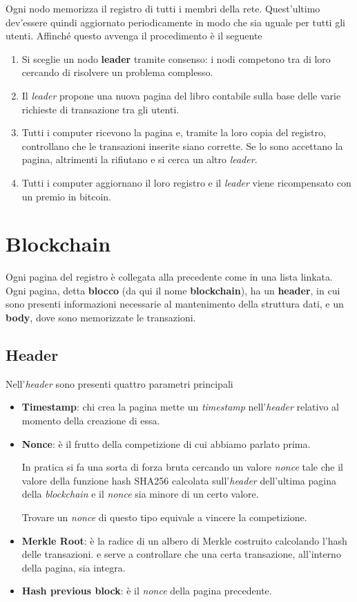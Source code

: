 Ogni nodo memorizza il registro di tutti i membri della rete. Quest'ultimo dev'essere quindi aggiornato periodicamente
in modo che sia uguale per tutti gli utenti. Affinch\'e questo avvenga il procedimento \`e il seguente
\begin{enumerate}
	\item Si sceglie un nodo \textbf{leader} tramite consenso: i nodi competono tra di loro cercando di risolvere un
	      problema complesso.
	\item Il \emph{leader} propone una nuova pagina del libro contabile sulla base delle varie richieste di transazione
	      tra gli utenti.
	\item Tutti i computer ricevono la pagina e, tramite la loro copia del registro, controllano che le transazioni
	      inserite siano corrette. Se lo sono accettano la pagina, altrimenti la rifiutano e si cerca un altro
	      \emph{leader}.
	\item Tutti i computer aggiornano il loro registro e il \emph{leader} viene ricompensato con un premio in bitcoin.
\end{enumerate}

\section{Blockchain}
Ogni pagina del registro \`e collegata alla precedente come in una lista linkata. Ogni pagina, detta \textbf{blocco}
(da qui il nome \textbf{blockchain}), ha un \textbf{header}, in cui sono presenti informazioni necessarie al
mantenimento della struttura dati, e un \textbf{body}, dove sono memorizzate le transazioni.

\subsection{Header}
Nell'\emph{header} sono presenti quattro parametri principali
\begin{itemize}
	\item \textbf{Timestamp}: chi crea la pagina mette un \emph{timestamp} nell'\emph{header} relativo al momento
	      della creazione di essa.
	\item \textbf{Nonce}: \`e il frutto della competizione di cui abbiamo parlato prima.

	      In pratica si fa una sorta di forza bruta cercando un valore \emph{nonce} tale che il valore della funzione
	      hash SHA256 calcolata sull'\emph{header} dell'ultima pagina della \emph{blockchain} e il \emph{nonce} sia
	      minore di un certo valore.

	      Trovare un \emph{nonce} di questo tipo equivale a vincere la competizione.
	\item \textbf{Merkle Root}: \`e la radice di un albero di Merkle costruito calcolando l'hash delle transazioni.
	      e serve a controllare che una certa transazione, all'interno della pagina, sia integra.
	\item \textbf{Hash previous block}: \`e il \emph{nonce} della pagina precedente.
\end{itemize}

